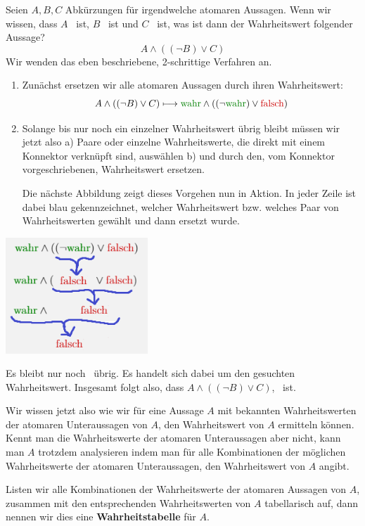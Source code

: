 \documentclass[../../main.tex]{subfiles}
\begin{document}
\begin{example}{}
Seien $A, B, C$ Abkürzungen für irgendwelche atomaren Aussagen. Wenn wir wissen, dass $A$ \wahr\  ist, $B$ \wahr\  ist und $C$ \falsch\   ist, was ist dann der Wahrheitswert folgender Aussage?
\[A \land ( (\lnot B) \lor C)\]
Wir wenden das eben beschriebene, 2-schrittige Verfahren an.
\begin{enumerate}
    \item Zunächst ersetzen wir alle atomaren Aussagen durch ihren Wahrheitswert:
    \[A \land ( (\lnot B) \lor C) \longmapsto  \wahr \land ((\lnot \wahr) \lor \falsch)\]
    \item Solange bis nur noch ein einzelner Wahrheitswert übrig bleibt müssen wir jetzt also a) Paare oder einzelne Wahrheitswerte, die direkt mit einem Konnektor verknüpft sind, auswählen b) und durch den, vom Konnektor vorgeschriebenen, Wahrheitswert ersetzen.
    
    Die nächste Abbildung zeigt dieses Vorgehen nun in Aktion. In jeder Zeile ist dabei blau gekennzeichnet, welcher Wahrheitswert bzw. welches Paar von Wahrheitswerten gewählt und dann ersetzt wurde. 
\end{enumerate}
\begin{center}
\includegraphics[width=0.4\textwidth]{images/TEMP_wahrheitsalg.png}
\end{center}
Es bleibt nur noch \falsch\  übrig. Es handelt sich dabei um den gesuchten Wahrheitswert. Insgesamt folgt also, dass $A \land ( (\lnot B) \lor C)$, \falsch\  ist.
\end{example}
Wir wissen jetzt also wie wir für eine Aussage $A$ mit bekannten Wahrheitswerten der atomaren Unteraussagen von $A$, den Wahrheitswert von $A$ ermitteln können. Kennt man die Wahrheitswerte der atomaren Unteraussagen aber nicht, kann man $A$ trotzdem analysieren indem man für alle Kombinationen der möglichen Wahrheitswerte der atomaren Unteraussagen, den Wahrheitswert von $A$ angibt.

Listen wir alle Kombinationen der Wahrheitswerte der atomaren Aussagen von $A$, zusammen mit den entsprechenden Wahrheitswerten von $A$ tabellarisch auf, dann nennen wir dies eine \textbf{Wahrheitstabelle} für $A$. 
\end{document}
